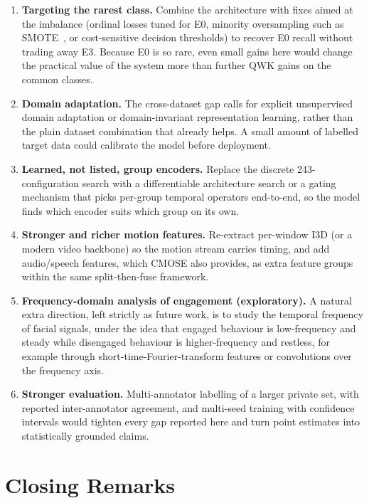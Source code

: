 \documentclass[../main.tex]{subfiles}
\begin{document}
\begin{enumerate}
  \item \textbf{Targeting the rarest class.}
  Combine the architecture with fixes aimed at the imbalance (ordinal losses tuned for E0, minority oversampling such as SMOTE~\cite{smote}, or cost-sensitive decision thresholds) to recover E0 recall without trading away E3. Because E0 is so rare, even small gains here would change the practical value of the system more than further QWK gains on the common classes.
  \item \textbf{Domain adaptation.}
  The cross-dataset gap calls for explicit unsupervised domain adaptation or domain-invariant representation learning, rather than the plain dataset combination that already helps. A small amount of labelled target data could calibrate the model before deployment.
  \item \textbf{Learned, not listed, group encoders.}
  Replace the discrete 243-configuration search with a differentiable architecture search or a gating mechanism that picks per-group temporal operators end-to-end, so the model finds which encoder suits which group on its own.
  \item \textbf{Stronger and richer motion features.}
  Re-extract per-window I3D (or a modern video backbone) so the motion stream carries timing, and add audio/speech features, which CMOSE also provides, as extra feature groups within the same split-then-fuse framework.
  \item \textbf{Frequency-domain analysis of engagement (exploratory).}
  A natural extra direction, left strictly as future work, is to study the temporal frequency of facial signals, under the idea that engaged behaviour is low-frequency and steady while disengaged behaviour is higher-frequency and restless, for example through short-time-Fourier-transform features or convolutions over the frequency axis.
  \item \textbf{Stronger evaluation.}
  Multi-annotator labelling of a larger private set, with reported inter-annotator agreement, and multi-seed training with confidence intervals would tighten every gap reported here and turn point estimates into statistically grounded claims.
\end{enumerate}

\FloatBarrier
\section{Closing Remarks}
\label{sec:closing}
\end{document}
